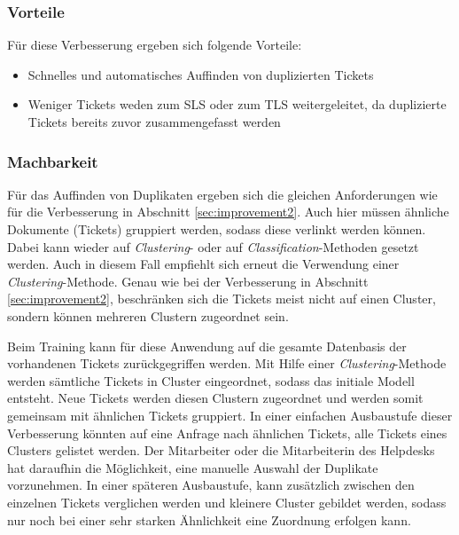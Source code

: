 \subsubsection{Vorteile}
Für diese Verbesserung ergeben sich folgende Vorteile:

\begin{itemize}
	\item Schnelles und automatisches Auffinden von duplizierten Tickets
	\item Weniger Tickets weden zum SLS oder zum TLS weitergeleitet, da duplizierte Tickets bereits zuvor zusammengefasst werden
\end{itemize}

\subsubsection{Machbarkeit}
Für das Auffinden von Duplikaten ergeben sich die gleichen Anforderungen wie für die Verbesserung in Abschnitt \ref{sec:improvement2}. Auch hier müssen ähnliche Dokumente (Tickets) gruppiert werden, sodass diese verlinkt werden können. Dabei kann wieder auf \textit{Clustering}- oder auf \textit{Classification}-Methoden gesetzt werden. Auch in diesem Fall empfiehlt sich erneut die Verwendung einer \textit{Clustering}-Methode. Genau wie bei der Verbesserung in Abschnitt \ref{sec:improvement2}, beschränken sich die Tickets meist nicht auf einen Cluster, sondern können mehreren Clustern zugeordnet sein.

Beim Training kann für diese Anwendung auf die gesamte Datenbasis der vorhandenen Tickets zurückgegriffen werden. Mit Hilfe einer \textit{Clustering}-Methode werden sämtliche Tickets in Cluster eingeordnet, sodass das initiale Modell entsteht. Neue Tickets werden diesen Clustern zugeordnet und werden somit gemeinsam mit ähnlichen Tickets gruppiert. In einer einfachen Ausbaustufe dieser Verbesserung könnten auf eine Anfrage nach ähnlichen Tickets, alle Tickets eines Clusters gelistet werden. Der Mitarbeiter oder die Mitarbeiterin des Helpdesks hat daraufhin die Möglichkeit, eine manuelle Auswahl der Duplikate vorzunehmen. In einer späteren Ausbaustufe, kann zusätzlich zwischen den einzelnen Tickets verglichen werden und kleinere Cluster gebildet werden, sodass nur noch bei einer sehr starken Ähnlichkeit eine Zuordnung erfolgen kann.
